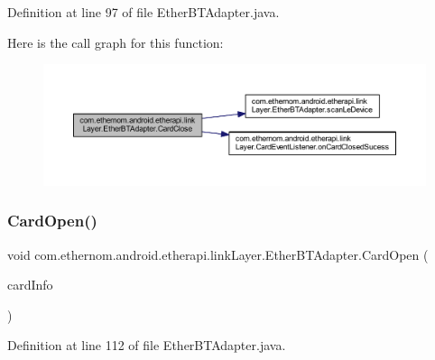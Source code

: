 Definition at line 97 of file Ether\+B\+T\+Adapter.\+java.

Here is the call graph for this function\+:
\nopagebreak
\begin{figure}[H]
\begin{center}
\leavevmode
\includegraphics[width=350pt]{classcom_1_1ethernom_1_1android_1_1etherapi_1_1link_layer_1_1_ether_b_t_adapter_a5fa7afd43aba43e8dc79e831f4ef274d_cgraph}
\end{center}
\end{figure}
\mbox{\label{classcom_1_1ethernom_1_1android_1_1etherapi_1_1link_layer_1_1_ether_b_t_adapter_ab497ade3ef9529ee8c6355f53925092f}} 
\subsubsection{\texorpdfstring{Card\+Open()}{CardOpen()}}
{\footnotesize\ttfamily void com.\+ethernom.\+android.\+etherapi.\+link\+Layer.\+Ether\+B\+T\+Adapter.\+Card\+Open (\begin{DoxyParamCaption}\item[{\mbox{\hyperlink{classcom_1_1ethernom_1_1android_1_1etherapi_1_1_card_info}{Card\+Info}}}]{card\+Info }\end{DoxyParamCaption})}



Definition at line 112 of file Ether\+B\+T\+Adapter.\+java.

